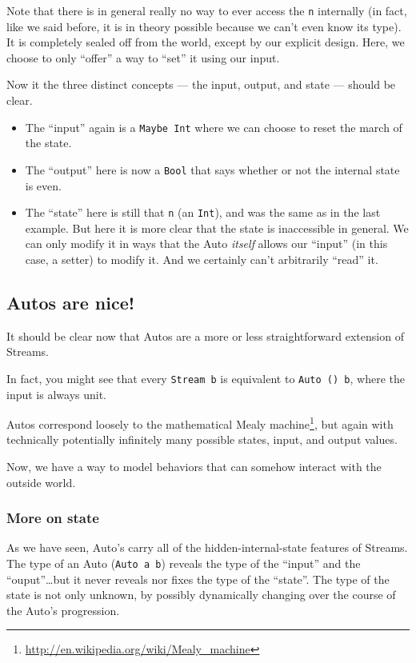 \documentclass[]{article}
\renewcommand{\href}[2]{#2\footnote{\url{#1}}}
\begin{document}
Note that there is in general really no way to ever access the \texttt{n}
internally (in fact, like we said before, it is in theory possible because we
can't even know its type). It is completely sealed off from the world, except by
our explicit design. Here, we choose to only ``offer'' a way to ``set'' it using
our input.

Now it the three distinct concepts --- the input, output, and state --- should
be clear.

\begin{itemize}
\tightlist
\item
  The ``input'' again is a \texttt{Maybe\ Int} where we can choose to reset the
  march of the state.
\item
  The ``output'' here is now a \texttt{Bool} that says whether or not the
  internal state is even.
\item
  The ``state'' here is still that \texttt{n} (an \texttt{Int}), and was the
  same as in the last example. But here it is more clear that the state is
  inaccessible in general. We can only modify it in ways that the Auto
  \emph{itself} allows our ``input'' (in this case, a setter) to modify it. And
  we certainly can't arbitrarily ``read'' it.
\end{itemize}

\subsection{Autos are nice!}\label{autos-are-nice}

It should be clear now that Autos are a more or less straightforward extension
of Streams.

In fact, you might see that every \texttt{Stream\ b} is equivalent to
\texttt{Auto\ ()\ b}, where the input is always unit.

Autos correspond loosely to the mathematical
\href{http://en.wikipedia.org/wiki/Mealy_machine}{Mealy machine}, but again with
technically potentially infinitely many possible states, input, and output
values.

Now, we have a way to model behaviors that can somehow interact with the outside
world.

\subsubsection{More on state}\label{more-on-state}

As we have seen, Auto's carry all of the hidden-internal-state features of
Streams. The type of an Auto (\texttt{Auto\ a\ b}) reveals the type of the
``input'' and the ``ouput''\ldots but it never reveals nor fixes the type of the
``state''. The type of the state is not only unknown, by possibly dynamically
changing over the course of the Auto's progression.
\end{document}
